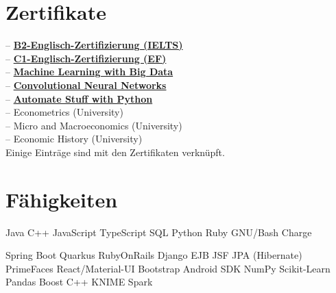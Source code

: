 \documentclass[]{CV-JuanCamiloFlorez}
\begin{document}
\begin{minipage}[t]{0.33\textwidth}
\section{Zertifikate}
-- \textbf{\href{https://jcamilo.co/IELTS-2022.pdf}{B2-Englisch-Zertifizierung (IELTS)}} \\
-- \textbf{\href{https://www.efset.org/cert/j8ebfw}{C1-Englisch-Zertifizierung (EF)}} \\
-- \textbf{\href{https://www.coursera.org/account/accomplishments/certificate/8MS64GGYWDT5?utm_medium=certificate&utm_source=link&utm_campaign=copybutton_certificate}{Machine Learning with Big Data}} \\
-- \textbf{\href{https://www.coursera.org/account/accomplishments/certificate/KFN2XJC2KP92?utm_medium=certificate&utm_source=link&utm_campaign=copybutton_certificate}{Convolutional Neural Networks}} \\
-- \textbf{\href{https://www.udemy.com/certificate/UC-ZHLLMBQA}{Automate Stuff with Python}} \\
-- Econometrics (University) \\
-- Micro and Macroeconomics (University) \\
-- Economic History (University) \\
\smallskip
\scriptsize{Einige Einträge sind mit den Zertifikaten verknüpft.}
\sectionsep


\section{Fähigkeiten}
    \textbullet{} Java
    \textbullet{} C++
    \textbullet{} JavaScript
    \textbullet{} TypeScript
    \textbullet{} SQL
    \textbullet{} Python
    \textbullet{} Ruby
    \textbullet{} GNU/Bash
    \textbullet{} Charge

    \textbullet{} Spring Boot
    \textbullet{} Quarkus
    \textbullet{} RubyOnRails
    \textbullet{} Django
    \textbullet{} EJB JSF JPA (Hibernate) PrimeFaces
    \textbullet{} React/Material-UI
    \textbullet{} Bootstrap
    \textbullet{} Android SDK
    \textbullet{} NumPy
    \textbullet{} Scikit-Learn
    \textbullet{} Pandas
    \textbullet{} Boost C++
    \textbullet{} KNIME
    \textbullet{} Spark


\end{minipage}
\end{document}
